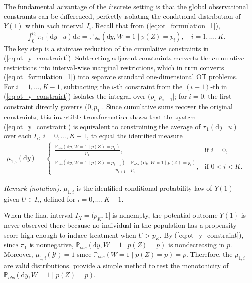 The fundamental advantage of the discrete setting is that the global observational constraints can be differenced, perfectly isolating the conditional distribution of $Y(1)$ within each interval $I_i$. Recall that from (\ref{eq:ot_formulation_1}),
\begin{align}\label{eq:ot_y_constraint}
    \int_0^{p_i} \pi_{1}(\mathrm{d}y \mid u) \mathrm{d}u = \mathbb{P}_{obs}(\mathrm{d}y, W=1 \mid p(Z)=p_i), \quad i=1,\dots,K.
\end{align}
The key step is a staircase reduction of the cumulative constraints in (\ref{eq:ot_y_constraint}). Subtracting adjacent constraints converts the cumulative restrictions into interval-wise marginal restrictions, which in turn converts (\ref{eq:ot_formulation_1}) into separate standard one-dimensional OT problems. For $i = 1, \dots, K-1$, subtracting the $i$-th constraint from the $(i+1)$-th in (\ref{eq:ot_y_constraint}) isolates the integral over $(p_i, p_{i+1}]$; for $i=0$, the first constraint directly governs $(0, p_1]$. Since cumulative sums recover the original constraints, this invertible transformation shows that the system (\ref{eq:ot_y_constraint}) is equivalent to constraining the average of $\pi_1(\mathrm{d}y\mid u)$ over each $I_i$, $i=0,\dots,K-1$, to equal the identified measure
\begin{align}\label{eq:y_identified_measure}
    \mu_{1, i}(\mathrm{d}y) =
    \begin{cases}
         \frac{\mathbb{P}_{obs}(\mathrm{d}y, W=1 \mid p(Z) = p_1 )}{p_1}, & \text{if } i=0, \\[4pt]
         \frac{\mathbb{P}_{obs}(\mathrm{d}y, W=1 \mid p(Z) = p_{i+1} ) - \mathbb{P}_{obs}(\mathrm{d}y, W=1 \mid p(Z) = p_{i} )}{p_{i+1} - p_i}, & \text{if } 0 < i < K.
    \end{cases}
\end{align}

\noindent\textit{Remark (notation).} $\mu_{1,i}$ is the identified conditional probability law of $Y(1)$ given $U\in I_i$, defined for $i=0,\ldots,K-1$.


When the final interval $I_K = (p_K, 1]$ is nonempty, the potential outcome $Y(1)$ is never observed there because no individual in the population has a propensity score high enough to induce treatment when $U > p_K$. By (\ref{eq:ot_y_constraint}), since $\pi_1$ is nonnegative, $\mathbb{P}_{obs}(\mathrm{d}y, W=1 \mid p(Z)=p)$ is nondecreasing in $p$. Moreover, $\mu_{1,i}(\mathcal{Y}) = 1$ since $\mathbb{P}_{obs}(W=1 \mid p(Z)=p) = p$. Therefore, the $\mu_{1,i}$ are valid distributions. \citet{mourifie2017testing} provide a simple method to test the monotonicity of $\mathbb{P}_{obs}(\mathrm{d}y, W=1 \mid p(Z)=p)$.

